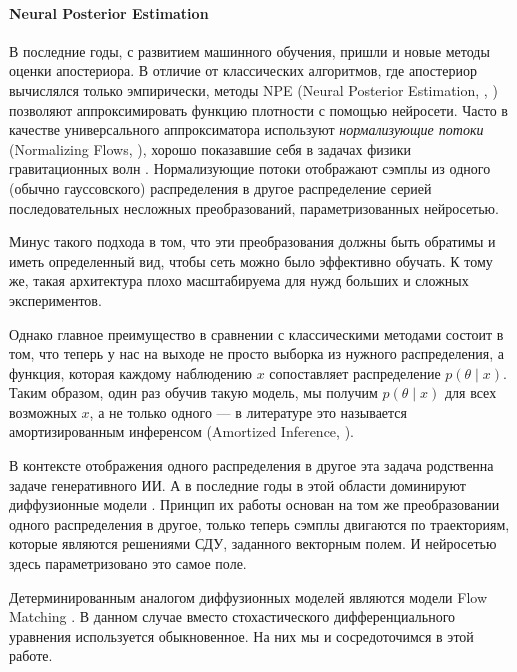     \paragraph{\textbf{Neural Posterior Estimation}} В последние годы, с развитием машинного обучения, 
    пришли и новые методы оценки апостериора. В отличие от классических алгоритмов, где апостериор вычислялся 
    только эмпирически, методы NPE (Neural Posterior Estimation, \cite{zammitmangion2024neuralmethodsamortizedinference}, 
    \cite{radev2020bayesflowlearningcomplexstochastic}) позволяют аппроксимировать функцию
    плотности с помощью нейросети. Часто в качестве универсального аппроксиматора используют \textit{нормализующие потоки} (Normalizing Flows, \cite{radev2020bayesflowlearningcomplexstochastic}),
    хорошо показавшие себя в задачах физики гравитационных волн \cite{dax2023flowmatchingscalablesimulationbased}. Нормализующие потоки отображают 
    сэмплы из одного (обычно гауссовского) распределения в другое распределение серией последовательных несложных преобразований,
    параметризованных нейросетью.
    
    Минус такого подхода в том, что эти преобразования должны быть обратимы 
    и иметь определенный вид, чтобы сеть можно было эффективно обучать. К тому же, такая архитектура плохо масштабируема
    для нужд больших и сложных экспериментов. 
    
    Однако главное преимущество в сравнении с классическими методами состоит в том, что теперь у нас на выходе
    не просто выборка из нужного распределения, а функция, которая каждому наблюдению $x$ сопоставляет распределение $p(\theta \mid x)$.
    Таким образом, один раз обучив такую модель, мы получим $p(\theta \mid x)$ для всех возможных $x$, а не только одного 
    --- в литературе это называется амортизированным инференсом (Amortized Inference, \cite{zammitmangion2024neuralmethodsamortizedinference}). 
    
    В контексте отображения одного распределения в другое эта задача родственна задаче генеративного ИИ. 
    А в последние годы в этой области доминируют диффузионные модели \cite{yang2025diffusionmodelscomprehensivesurvey}. Принцип их работы
    основан на том же преобразовании одного распределения в другое, только теперь сэмплы двигаются по траекториям, 
    которые являются решениями СДУ, заданного векторным полем. И нейросетью здесь параметризовано это самое поле.
    
    Детерминированным аналогом диффузионных моделей являются модели Flow Matching \cite{lipman2024flowmatchingguidecode}. В данном случае
    вместо стохастического дифференциального уравнения используется обыкновенное. На них мы и сосредоточимся в этой работе.
    

